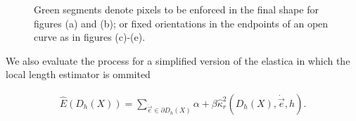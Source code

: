 \begin{figure}[h!]
{}\hspace{1em}%
\hspace{1em}%
\hspace{1em}%

\caption{Green segments denote pixels to be enforced in the final shape for figures (a) and (b); or fixed orientations in the endpoints of an open curve as in figures (c)-(e). }
\label{fig:fixed-pixels-evolution}
\end{figure}

We also evaluate the process for a simplified version of the elastica in which the local length estimator is ommited

	\begin{align}
	\hat{E}( D_h(X) ) = \sum_{\dot{\vec{e}} \in \partial D_h(X)}{ \alpha + \beta \hat{\kappa}_{r}^2(D_h(X),\dot{\vec{e}},h) }.
	\label{eq:simplified-digital-elastica}
	\end{align}
	
